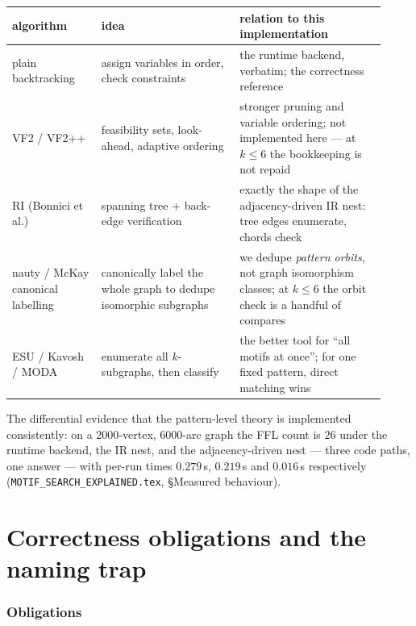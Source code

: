 \documentclass[11pt,a4paper]{article}
\newcommand{\file}[1]{\texttt{#1}}
\begin{document}
\begin{center}
\begin{tabular}{@{}p{0.22\linewidth}p{0.34\linewidth}p{0.36\linewidth}@{}}
\toprule
algorithm & idea & relation to this implementation \\
\midrule
plain backtracking & assign variables in order, check constraints & the runtime
backend, verbatim; the correctness reference \\
VF2 / VF2++ & feasibility sets, look-ahead, adaptive ordering & stronger pruning
and variable ordering; not implemented here --- at $k\le6$ the bookkeeping is
not repaid \\
RI (Bonnici et al.) & spanning tree + back-edge verification & exactly the
shape of the adjacency-driven IR nest: tree edges enumerate, chords check \\
nauty / McKay canonical labelling & canonically label the whole graph to dedupe
isomorphic subgraphs & we dedupe \emph{pattern orbits}, not graph isomorphism
classes; at $k\le6$ the orbit check is a handful of compares \\
ESU / Kavosh / MODA & enumerate all $k$-subgraphs, then classify & the better
tool for ``all motifs at once''; for one fixed pattern, direct matching wins \\
\bottomrule
\end{tabular}
\end{center}

The differential evidence that the pattern-level theory is implemented
consistently: on a 2000-vertex, 6000-arc graph the FFL count is $26$ under the
runtime backend, the IR nest, and the adjacency-driven nest --- three code paths,
one answer --- with per-run times $0.279$\,s, $0.219$\,s and $0.016$\,s
respectively (\file{MOTIF\_SEARCH\_EXPLAINED.tex}, \S Measured behaviour).

\part{Correctness obligations and the naming trap}

\section{Obligations}
\end{document}
